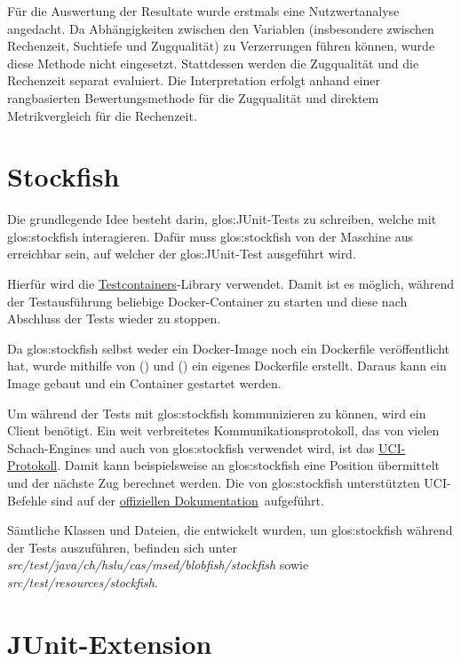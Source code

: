 Für die Auswertung der Resultate wurde erstmals eine Nutzwertanalyse angedacht.
Da Abhängigkeiten zwischen den Variablen (insbesondere zwischen Rechenzeit, Suchtiefe und Zugqualität) zu Verzerrungen führen können, wurde diese Methode nicht eingesetzt.
Stattdessen werden die Zugqualität und die Rechenzeit separat evaluiert.
Die Interpretation erfolgt anhand einer rangbasierten Bewertungsmethode für die Zugqualität und direktem Metrikvergleich für die Rechenzeit.

\section{Stockfish}

Die grundlegende Idee besteht darin, \gls{glos:JUnit}-Tests zu schreiben, welche mit \gls{glos:stockfish} interagieren. Dafür muss
\gls{glos:stockfish} von der Maschine aus erreichbar sein, auf welcher der \gls{glos:JUnit}-Test ausgeführt wird.

Hierfür wird die \href{https://testcontainers.com/}{Testcontainers}-Library verwendet. Damit ist es möglich, während der
Testausführung beliebige Docker-Container zu starten und diese nach Abschluss der Tests wieder zu stoppen.

Da \gls{glos:stockfish} selbst weder ein Docker-Image noch ein Dockerfile veröffentlicht hat, wurde mithilfe von
(\cite{stockfishCompilingFromSource}) und (\cite{socatExamples}) ein eigenes Dockerfile erstellt.
Daraus kann ein Image gebaut und ein Container gestartet werden.

Um während der Tests mit \gls{glos:stockfish} kommunizieren zu können, wird ein Client benötigt. Ein weit verbreitetes
Kommunikationsprotokoll, das von vielen Schach-Engines und auch von \gls{glos:stockfish} verwendet wird, ist das \href{https://backscattering.de/chess/uci/}{UCI-Protokoll}.
Damit kann beispielsweise an \gls{glos:stockfish} eine Position übermittelt und der nächste Zug berechnet werden.
Die von \gls{glos:stockfish} unterstützten UCI-Befehle sind auf der \href{https://official-stockfish.github.io/docs/stockfish-wiki/UCI-\&-Commands.html}{offiziellen Dokumentation}~aufgeführt.

Sämtliche Klassen und Dateien, die entwickelt wurden, um \gls{glos:stockfish} während der Tests auszuführen, befinden sich unter
\textit{src/test/java/ch/hslu/cas/msed/blobfish/stockfish} sowie \textit{src/test/resources/stockfish}.

\section{JUnit-Extension}

